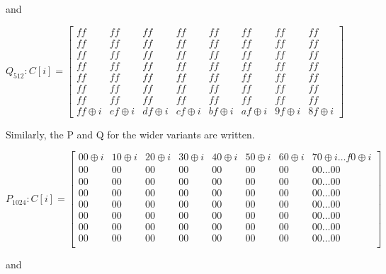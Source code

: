 \begin{itemize}
    and 

    $Q_{512}: C[i] = \begin{bmatrix}
      ff     & ff     & ff     & ff     & ff     & ff     & ff     & ff     \\
      ff     & ff     & ff     & ff     & ff     & ff     & ff     & ff     \\
      ff     & ff     & ff     & ff     & ff     & ff     & ff     & ff     \\
      ff     & ff     & ff     & ff     & ff     & ff     & ff     & ff     \\
      ff     & ff     & ff     & ff     & ff     & ff     & ff     & ff     \\
      ff     & ff     & ff     & ff     & ff     & ff     & ff     & ff     \\
      ff     & ff     & ff     & ff     & ff     & ff     & ff     & ff     \\
      ff \oplus i & ef \oplus i & df \oplus i & cf \oplus i & bf \oplus i & af \oplus i & 9f \oplus i & 8f \oplus i 
    \end{bmatrix}$

    Similarly, the P and Q for the wider variants are written.

    $ P_{1024}: C[i] = \begin{bmatrix}
      00 \oplus i & 10 \oplus i & 20 \oplus i & 30 \oplus i & 40 \oplus i & 50 \oplus i & 60 \oplus i & 70 \oplus i \ldots f0 \oplus i \\
      00     & 00     & 00     & 00     & 00     & 00     & 00     & 00     \dots 00 \\
      00     & 00     & 00     & 00     & 00     & 00     & 00     & 00     \dots 00 \\
      00     & 00     & 00     & 00     & 00     & 00     & 00     & 00     \dots 00 \\
      00     & 00     & 00     & 00     & 00     & 00     & 00     & 00     \dots 00 \\
      00     & 00     & 00     & 00     & 00     & 00     & 00     & 00     \dots 00 \\
      00     & 00     & 00     & 00     & 00     & 00     & 00     & 00     \dots 00 \\
      00     & 00     & 00     & 00     & 00     & 00     & 00     & 00     \dots 00 \\
    \end{bmatrix}$

    and 


\end{itemize}
